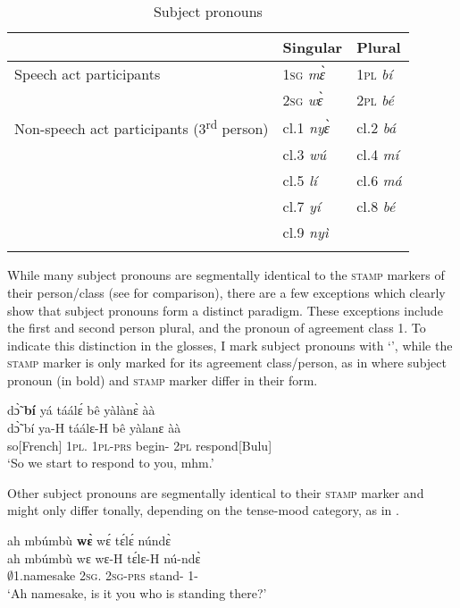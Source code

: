 \begin{table}
\begin{tabular}{lll}
 \lsptoprule
 & Singular & Plural \\
\midrule
Speech act participants & 1\textsc{sg} {\itshape mɛ̀} & 1\textsc{pl} {\itshape bí} \\
 & 2\textsc{sg} {\itshape wɛ̀} & 2\textsc{pl} {\itshape bé} \\
 \midrule
Non-speech act participants (3\textsuperscript{rd} person) & cl.1 {\itshape nyɛ̀} & cl.2 {\itshape bá} \\
 & cl.3 {\itshape wú} & cl.4  {\itshape mí} \\
& cl.5 {\itshape lí} & cl.6 {\itshape má} \\
 & cl.7 {\itshape yí} & cl.8 {\itshape bé} \\
&  cl.9 {\itshape nyì} & \\
 \lspbottomrule
\end{tabular}
\caption{Subject pronouns}
\label{Tab:SBJpro}
\end{table}

While many subject pronouns are segmentally identical to the \textsc{stamp} markers of their person/class (see  for comparison), there are a few exceptions which clearly show that subject pronouns form a distinct paradigm.  These exceptions include the first and second person plural,  and the pronoun of agreement class 1. To indicate this distinction in the glosses, I mark subject pronouns with  `{\SBJ}', while the \textsc{stamp} marker is only marked for its agreement class/person, as in  where subject pronoun (in bold) and \textsc{stamp} marker differ in their form.

\ea \label{SBJpro1}
  \glll  dɔ̃̀ {\bfseries bí} yá táálɛ́ bê yàlànɛ̀ àà \\
        dɔ̃̀ bí ya-H táálɛ-H bê yàlanɛ àà \\
       so[French] 1\textsc{pl}.{\SBJ}  1\textsc{pl}-\textsc{prs} begin-{\R} 2\textsc{pl} respond[Bulu] {\EXCL}   \\
    \trans `So we start to respond to you, mhm.'
\z

Other subject pronouns are segmentally identical to their \textsc{stamp} marker and might only differ tonally, depending on the tense-mood category, as in .

\ea \label{SBJpro2}
  \glll ah mbúmbù {\bfseries wɛ̀} wɛ́ tɛ́lɛ́ núndɛ̀ \\
      ah mbúmbù wɛ wɛ-H tɛ́lɛ-H nú-ndɛ̀ \\
        {\EXCL} $\emptyset$1.namesake 2\textsc{sg}.{\SBJ} 2\textsc{sg}-\textsc{prs} stand-{\R} 1-{\ANA} \\
    \trans `Ah namesake, is it you who is standing there?'
\z

